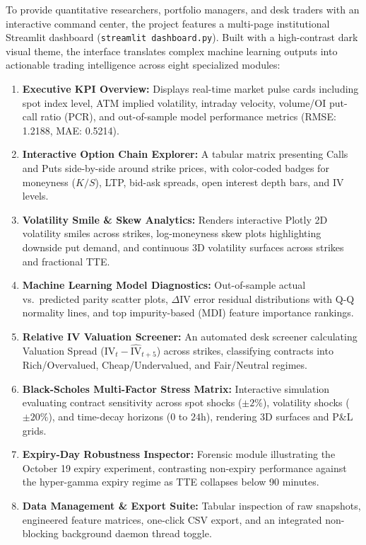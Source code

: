 To provide quantitative researchers, portfolio managers, and desk traders with an interactive command center, the project features a multi-page institutional Streamlit dashboard (\texttt{streamlit dashboard.py}). Built with a high-contrast dark visual theme, the interface translates complex machine learning outputs into actionable trading intelligence across eight specialized modules:

\begin{enumerate}\setlength{\itemsep}{1pt}\setlength{\parskip}{0pt}
    \item \textbf{Executive KPI Overview:} Displays real-time market pulse cards including spot index level, ATM implied volatility, intraday velocity, volume/OI put-call ratio (PCR), and out-of-sample model performance metrics (RMSE: 1.2188, MAE: 0.5214).
    \item \textbf{Interactive Option Chain Explorer:} A tabular matrix presenting Calls and Puts side-by-side around strike prices, with color-coded badges for moneyness ($K/S$), LTP, bid-ask spreads, open interest depth bars, and IV levels.
    \item \textbf{Volatility Smile \& Skew Analytics:} Renders interactive Plotly 2D volatility smiles across strikes, log-moneyness skew plots highlighting downside put demand, and continuous 3D volatility surfaces across strikes and fractional TTE.
    \item \textbf{Machine Learning Model Diagnostics:} Out-of-sample actual vs.\ predicted parity scatter plots, $\Delta \text{IV}$ error residual distributions with Q-Q normality lines, and top impurity-based (MDI) feature importance rankings.
    \item \textbf{Relative IV Valuation Screener:} An automated desk screener calculating Valuation Spread ($\text{IV}_t - \widehat{\text{IV}}_{t+5}$) across strikes, classifying contracts into Rich/Overvalued, Cheap/Undervalued, and Fair/Neutral regimes.
    \item \textbf{Black-Scholes Multi-Factor Stress Matrix:} Interactive simulation evaluating contract sensitivity across spot shocks ($\pm 2\%$), volatility shocks ($\pm 20\%$), and time-decay horizons ($0$ to $24\text{h}$), rendering 3D surfaces and P\&L grids.
    \item \textbf{Expiry-Day Robustness Inspector:} Forensic module illustrating the October 19 expiry experiment, contrasting non-expiry performance against the hyper-gamma expiry regime as TTE collapses below 90 minutes.
    \item \textbf{Data Management \& Export Suite:} Tabular inspection of raw snapshots, engineered feature matrices, one-click CSV export, and an integrated non-blocking background daemon thread toggle.
\end{enumerate}
